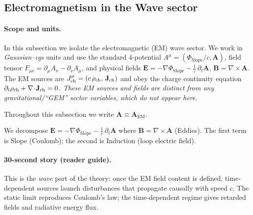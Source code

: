 \subsection{Electromagnetism in the Wave sector}
\label{subsec:em_wave}

\paragraph{Scope and units.}
In this subsection we isolate the electromagnetic (EM) wave sector. We work in \emph{Gaussian--cgs} units and use the standard 4-potential
\(A^\mu=(\Phi_{\text{Slope}}/c,\mathbf A)\), field tensor \(F_{\mu\nu}=\partial_\mu A_\nu-\partial_\nu A_\mu\),
and physical fields \(\mathbf E=-\nabla\Phi_{\text{Slope}}-\tfrac1c\,\partial_t\mathbf A\), \(\mathbf B=\nabla\times\mathbf A\).
The EM sources are \(J^\mu_{\rm ch}=(c\,\rho_{\rm ch},\,\mathbf J_{\rm ch})\) and obey the
charge continuity equation \(\partial_t\rho_{\rm ch}+\nabla\!\cdot\!\mathbf J_{\rm ch}=0\).
\emph{These EM sources and fields are distinct from any gravitational/``GEM'' sector variables, which do not appear here.}

Throughout this subsection we write $\mathbf A \equiv \mathbf A_{\text{EM}}$.

We decompose $\mathbf E = -\nabla \Phi_{\text{Slope}} - \tfrac{1}{c}\,\partial_t \mathbf A$ where $\mathbf B=\nabla\times\mathbf A$ (Eddies). The first term is Slope (Coulomb); the second is Induction (loop electric field).

\paragraph{30-second story (reader guide).}
This is the \emph{wave} part of the theory: once the EM field content is defined,
time-dependent sources launch disturbances that propagate causally with speed \(c\).
The static limit reproduces Coulomb's law; the time-dependent regime gives retarded fields and radiative energy flux.

